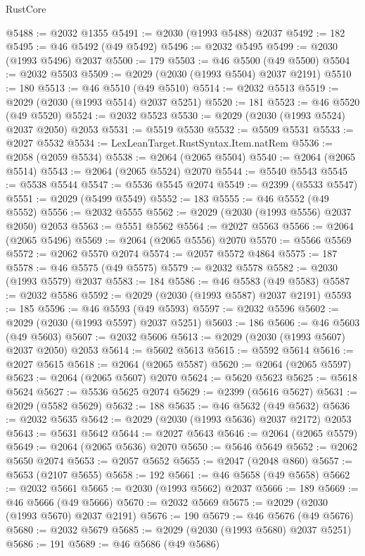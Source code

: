 \begin{lexlean}{RustCore}
\begin{coremodule}
@5488 := @2032 @1355
@5491 := @2030 (@1993 @5488) @2037
@5492 := 182
@5495 := @46 @5492 (@49 @5492)
@5496 := @2032 @5495
@5499 := @2030 (@1993 @5496) @2037
@5500 := 179
@5503 := @46 @5500 (@49 @5500)
@5504 := @2032 @5503
@5509 := @2029 (@2030 (@1993 @5504) @2037 @2191)
@5510 := 180
@5513 := @46 @5510 (@49 @5510)
@5514 := @2032 @5513
@5519 := @2029 (@2030 (@1993 @5514) @2037 @5251)
@5520 := 181
@5523 := @46 @5520 (@49 @5520)
@5524 := @2032 @5523
@5530 := @2029 (@2030 (@1993 @5524) @2037 @2050) @2053
@5531 := @5519 @5530
@5532 := @5509 @5531
@5533 := @2027 @5532
@5534 := LexLeanTarget.RustSyntax.Item.natRem
@5536 := @2058 (@2059 @5534)
@5538 := @2064 (@2065 @5504)
@5540 := @2064 (@2065 @5514)
@5543 := @2064 (@2065 @5524) @2070
@5544 := @5540 @5543
@5545 := @5538 @5544
@5547 := @5536 @5545 @2074
@5549 := @2399 (@5533 @5547)
@5551 := @2029 (@5499 @5549)
@5552 := 183
@5555 := @46 @5552 (@49 @5552)
@5556 := @2032 @5555
@5562 := @2029 (@2030 (@1993 @5556) @2037 @2050) @2053
@5563 := @5551 @5562
@5564 := @2027 @5563
@5566 := @2064 (@2065 @5496)
@5569 := @2064 (@2065 @5556) @2070
@5570 := @5566 @5569
@5572 := @2062 @5570 @2074
@5574 := @2057 @5572 @4864
@5575 := 187
@5578 := @46 @5575 (@49 @5575)
@5579 := @2032 @5578
@5582 := @2030 (@1993 @5579) @2037
@5583 := 184
@5586 := @46 @5583 (@49 @5583)
@5587 := @2032 @5586
@5592 := @2029 (@2030 (@1993 @5587) @2037 @2191)
@5593 := 185
@5596 := @46 @5593 (@49 @5593)
@5597 := @2032 @5596
@5602 := @2029 (@2030 (@1993 @5597) @2037 @5251)
@5603 := 186
@5606 := @46 @5603 (@49 @5603)
@5607 := @2032 @5606
@5613 := @2029 (@2030 (@1993 @5607) @2037 @2050) @2053
@5614 := @5602 @5613
@5615 := @5592 @5614
@5616 := @2027 @5615
@5618 := @2064 (@2065 @5587)
@5620 := @2064 (@2065 @5597)
@5623 := @2064 (@2065 @5607) @2070
@5624 := @5620 @5623
@5625 := @5618 @5624
@5627 := @5536 @5625 @2074
@5629 := @2399 (@5616 @5627)
@5631 := @2029 (@5582 @5629)
@5632 := 188
@5635 := @46 @5632 (@49 @5632)
@5636 := @2032 @5635
@5642 := @2029 (@2030 (@1993 @5636) @2037 @2172) @2053
@5643 := @5631 @5642
@5644 := @2027 @5643
@5646 := @2064 (@2065 @5579)
@5649 := @2064 (@2065 @5636) @2070
@5650 := @5646 @5649
@5652 := @2062 @5650 @2074
@5653 := @2057 @5652
@5655 := @2047 (@2048 @860)
@5657 := @5653 (@2107 @5655)
@5658 := 192
@5661 := @46 @5658 (@49 @5658)
@5662 := @2032 @5661
@5665 := @2030 (@1993 @5662) @2037
@5666 := 189
@5669 := @46 @5666 (@49 @5666)
@5670 := @2032 @5669
@5675 := @2029 (@2030 (@1993 @5670) @2037 @2191)
@5676 := 190
@5679 := @46 @5676 (@49 @5676)
@5680 := @2032 @5679
@5685 := @2029 (@2030 (@1993 @5680) @2037 @5251)
@5686 := 191
@5689 := @46 @5686 (@49 @5686)

\end{coremodule}
\end{lexlean}
